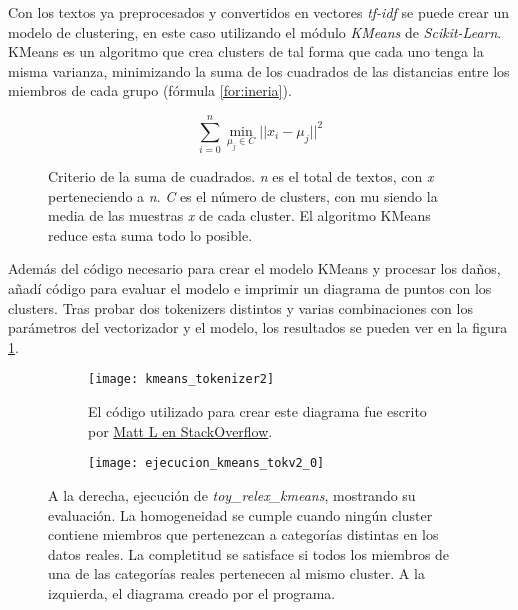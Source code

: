 \documentclass{pre-tfg}
\begin{document}
Con los textos ya preprocesados y convertidos en vectores \textit{tf-idf} se puede crear un modelo de clustering, en este caso utilizando el módulo \textit{KMeans} de \textit{Scikit-Learn}. KMeans es un algoritmo que crea clusters de tal forma que cada uno tenga la misma varianza, minimizando la suma de los cuadrados de las distancias entre los miembros de cada grupo (fórmula \ref{for:ineria}).

\begin{figure}[h]
	\begin{equation}
	\sum_{i=0}^{n}\min_{\mu_j \in C}{||x_i - \mu_j ||^2}
	\label{for:ineria}
	\end{equation}
	\caption{Criterio de la suma de cuadrados. \textit{n} es el total de textos, con \textit{x} perteneciendo a \textit{n}. \textit{C} es el número de clusters, con mu siendo la media de las muestras \textit{x} de cada cluster. El algoritmo KMeans reduce esta suma todo lo posible.}
	
\end{figure}

Además del código necesario para crear el modelo KMeans y procesar los daños, añadí código para evaluar el modelo e imprimir un diagrama de puntos con los clusters. Tras probar dos tokenizers distintos y varias combinaciones con los parámetros del vectorizador y el modelo, los resultados se pueden ver en la figura \ref{fig:kmeanresult}.

\begin{figure}[!h]
	\centering
	
	\begin{subfigure}{.4\textwidth}
		\texttt{[image: kmeans\_tokenizer2]}
		\caption{El código utilizado para crear este diagrama fue escrito por \href{https://stackoverflow.com/questions/57626286/how-to-plot-text-clusters}{Matt L en StackOverflow}.}
	\end{subfigure}%
	\begin{subfigure}{.5\textwidth}
		\centering
		\texttt{[image: ejecucion\_kmeans\_tokv2\_0]}
	\end{subfigure}
		
	\caption{A la derecha, ejecución de \textit{toy\_relex\_kmeans}, mostrando su evaluación. La homogeneidad se cumple cuando ningún cluster contiene miembros que pertenezcan a categorías distintas en los datos reales. La completitud se satisface si todos los miembros de una de las categorías reales pertenecen al mismo cluster. A la izquierda, el diagrama creado por el programa.}
	\label{fig:kmeanresult}
\end{figure}
\end{document}
